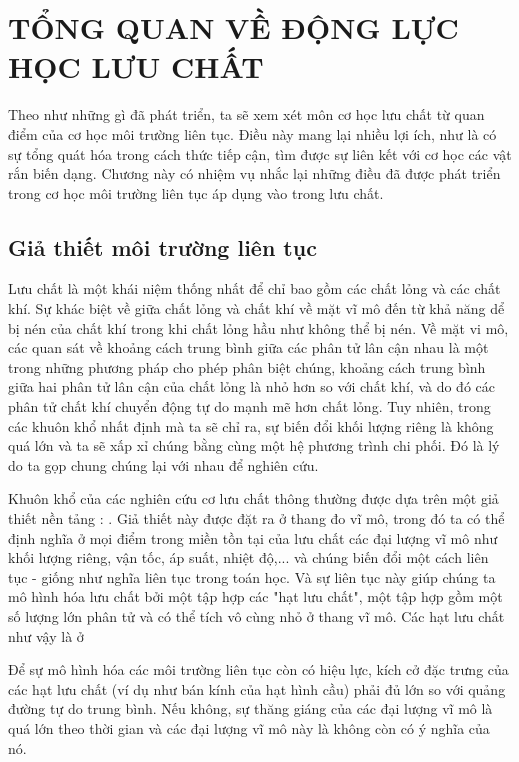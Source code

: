 \documentclass[CO_LUU_CHAT.tex]{subfiles}
\begin{document}
\chapter{TỔNG QUAN VỀ ĐỘNG LỰC HỌC LƯU CHẤT}

	Theo như những gì đã phát triển, ta sẽ xem xét môn cơ học lưu chất từ quan điểm của cơ học môi trường liên tục. Điều này mang lại nhiều lợi ích, như là có sự tổng quát hóa trong cách thức tiếp cận, tìm được sự liên kết với cơ học các vật rắn biến dạng. Chương này có nhiệm vụ nhắc lại những điều đã được phát triển trong cơ học môi trường liên tục áp dụng vào trong lưu chất.

\newpage

\section{Giả thiết môi trường liên tục}
		
		Lưu chất là một khái niệm thống nhất để chỉ bao gồm các chất lỏng và các chất khí. Sự khác biệt về giữa chất lỏng và chất khí về mặt vĩ mô đến từ khả năng dể bị nén của chất khí trong khi chất lỏng hầu như không thể bị nén. Về mặt vi mô, các quan sát về khoảng cách trung bình giữa các phân tử lân cận nhau là một trong những phương pháp cho phép phân biệt chúng, khoảng cách trung bình giữa hai phân tử lân cận của chất lỏng là nhỏ hơn so với chất khí, và do đó các phân tử chất khí chuyển động tự do mạnh mẽ hơn chất lỏng. Tuy nhiên, trong các khuôn khổ nhất định mà ta sẽ chỉ ra, sự biến đổi khối lượng riêng là không quá lớn và ta sẽ xấp xỉ chúng bằng cùng một hệ phương trình chi phối. Đó là lý do ta gọp chung chúng lại với nhau để nghiên cứu.
		
		Khuôn khổ của các nghiên cứu cơ lưu chất thông thường được dựa trên một giả thiết nền tảng : . Giả thiết này được đặt ra ở thang đo vĩ mô, trong đó ta có thể định nghĩa ở mọi điểm trong miền tồn tại của lưu chất các đại lượng vĩ mô như khối lượng riêng, vận tốc, áp suất, nhiệt độ,... và chúng biến đổi một cách liên tục - giống như nghĩa liên tục trong toán học. Và sự liên tục này giúp chúng ta mô hình hóa lưu chất bởi một tập hợp các "hạt lưu chất", một tập hợp gồm một số lượng lớn phân tử và có thể tích vô cùng nhỏ ở thang vĩ mô. Các hạt lưu chất như vậy là ở 
		
		Để sự mô hình hóa các môi trường liên tục còn có hiệu lực, kích cở đặc trưng của các hạt lưu chất (ví dụ như bán kính của hạt hình cầu) phải đủ lớn so với quảng đường tự do trung bình. Nếu không, sự thăng giáng của các đại lượng vĩ mô là quá lớn theo thời gian và các đại lượng vĩ mô này là không còn có ý nghĩa của nó.
		
\end{document}
